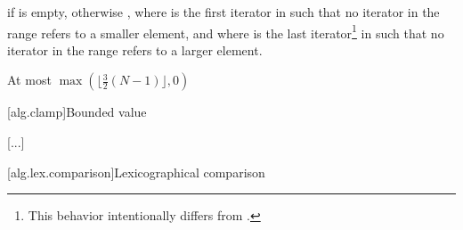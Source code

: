 \begin{itemdescr}
\pnum
\returns {}
if  is empty, otherwise
, where  is
the first iterator in  such that no iterator in the range refers
to a smaller element, and where  is the last iterator\footnote{This behavior
intentionally differs from .}
in  such that no iterator in the range refers to a larger element.

\pnum
\complexity {}
At most
$\max(\bigl\lfloor{\frac{3}{2}} (N-1)\bigr\rfloor, 0)$
\end{itemdescr}


[alg.clamp]{Bounded value}

[...]

[alg.lex.comparison]{Lexicographical comparison}

